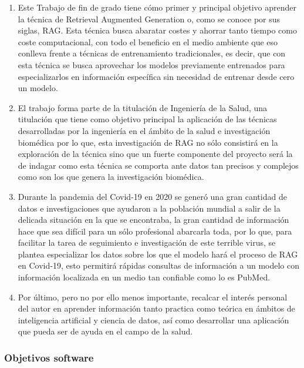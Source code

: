 \begin{enumerate}

    \item Este Trabajo de fin de grado tiene cómo primer y principal objetivo aprender la técnica de Retrieval Augmented Generation o, como se conoce por sus siglas, RAG. Esta técnica busca abaratar costes y ahorrar tanto tiempo como coste computacional, con todo el beneficio en el medio ambiente que eso conlleva frente a técnicas de entrenamiento tradicionales, es decir, que con esta técnica se busca aprovechar los modelos previamente entrenados para especializarlos en información específica sin necesidad de entrenar desde cero un modelo.
    
    \item El trabajo forma parte de la titulación de Ingeniería de la Salud, una titulación que tiene como objetivo principal la aplicación de las técnicas desarrolladas por la ingeniería en el ámbito de la salud e investigación biomédica por lo que, esta investigación de RAG no sólo consistirá en la exploración de la técnica sino que un fuerte componente del proyecto será la de indagar como esta técnica se comporta ante datos tan precisos y complejos como son los que genera la investigación biomédica.
    
    \item Durante la pandemia del Covid-19 en 2020 se generó una gran cantidad de datos e investigaciones que ayudaron a la población mundial a salir de la delicada situación en la que se encontraba, la gran cantidad de información hace que sea difícil para un sólo profesional abarcarla toda, por lo que, para facilitar la tarea de seguimiento e investigación de este terrible virus, se plantea especializar los datos sobre los que el modelo hará el proceso de RAG en Covid-19, esto permitirá rápidas consultas de información a un modelo con información localizada en un medio tan confiable como lo es PubMed. 

    \item Por último, pero no por ello menos importante, recalcar el interés personal del autor en aprender información tanto practica como teórica en ámbitos de inteligencia artificial y ciencia de datos, así como desarrollar una aplicación que pueda ser de ayuda en el campo de la salud.
    
\end{enumerate}

\subsubsection{Objetivos software}

